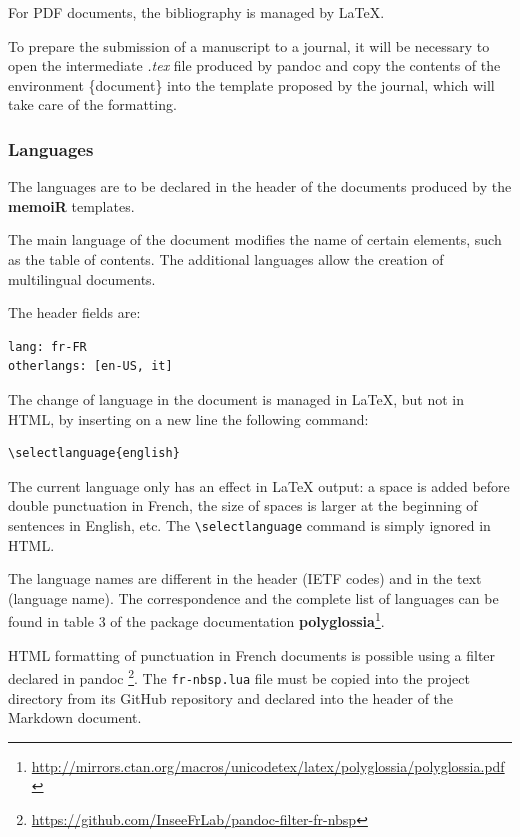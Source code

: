 \documentclass[
  12pt,
  american,
  a4paper,
  extrafontsizes,onecolumn,openright
  ]{memoir}
\begin{document}
For PDF documents, the bibliography is managed by LaTeX.

To prepare the submission of a manuscript to a journal, it will be necessary to open the intermediate \emph{.tex} file produced by pandoc and copy the contents of the environment \{document\} into the template proposed by the journal, which will take care of the formatting.

\subsubsection{Languages}\label{languages}

The languages are to be declared in the header of the documents produced by the \textbf{memoiR} templates.

The main language of the document modifies the name of certain elements, such as the table of contents.
The additional languages allow the creation of multilingual documents.

The header fields are:

\begin{verbatim}
lang: fr-FR
otherlangs: [en-US, it]
\end{verbatim}

The change of language in the document is managed in LaTeX, but not in HTML, by inserting on a new line the following command:

\begin{verbatim}
\selectlanguage{english}
\end{verbatim}

The current language only has an effect in LaTeX output: a space is added before double punctuation in French, the size of spaces is larger at the beginning of sentences in English, etc.
The \texttt{\textbackslash{}selectlanguage} command is simply ignored in HTML.

The language names are different in the header (IETF codes) and in the text (language name).
The correspondence and the complete list of languages can be found in table 3 of the package documentation \textbf{polyglossia}\footnote{\url{http://mirrors.ctan.org/macros/unicodetex/latex/polyglossia/polyglossia.pdf}}.

HTML formatting of punctuation in French documents is possible using a filter declared in pandoc \footnote{\url{https://github.com/InseeFrLab/pandoc-filter-fr-nbsp}}.
The \texttt{fr-nbsp.lua} file must be copied into the project directory from its GitHub repository and declared into the header of the Markdown document.
\end{document}
